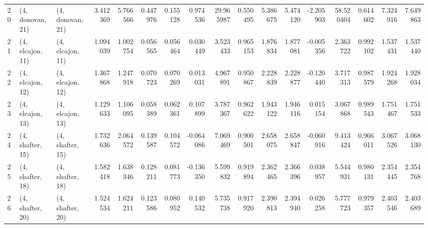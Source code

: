 \begin{tabular}{lllrrrrrrrrrrrrrr}
20 &  (4, donovan, 21) &  (4, donovan, 21) &  3.412369 &  5.766566 &   0.447976 &  0.155128 &  0.974536 &  29.965987 &  0.550495 &   5.386675 &  5.474120 & -2.205903 &  58.520404 &  0.614602 &  7.324916 &  7.649863 \\
21 &  (4, elcajon, 11) &  (4, elcajon, 11) &  1.094039 &  1.002754 &   0.056565 &  0.056464 &  0.030449 &   3.523433 &  0.965153 &   1.876834 &  1.877081 & -0.005356 &   2.363722 &  0.992102 &  1.537431 &  1.537440 \\
22 &  (4, elcajon, 12) &  (4, elcajon, 12) &  1.367868 &  1.247918 &   0.070723 &  0.070269 &  0.013031 &   4.967891 &  0.950867 &   2.228839 &  2.228877 & -0.120440 &   3.717313 &  0.987579 &  1.924268 &  1.928034 \\
23 &  (4, elcajon, 13) &  (4, elcajon, 13) &  1.129633 &  1.106095 &   0.058389 &  0.062361 &  0.107899 &   3.787367 &  0.962622 &   1.943122 &  1.946116 &  0.015154 &   3.067868 &  0.989543 &  1.751467 &  1.751533 \\
24 &  (4, shafter, 15) &  (4, shafter, 15) &  1.732636 &  2.064572 &   0.139587 &  0.104572 & -0.064086 &   7.069469 &  0.900501 &   2.658075 &  2.658847 & -0.060916 &   9.413424 &  0.966011 &  3.067526 &  3.068130 \\
25 &  (4, shafter, 18) &  (4, shafter, 18) &  1.582418 &  1.638346 &   0.128211 &  0.081773 & -0.136350 &   5.599832 &  0.919894 &   2.362465 &  2.366396 &  0.038957 &   5.544931 &  0.980131 &  2.354445 &  2.354768 \\
26 &  (4, shafter, 20) &  (4, shafter, 20) &  1.524534 &  1.624211 &   0.123586 &  0.080952 &  0.140532 &   5.735738 &  0.917920 &   2.390813 &  2.394940 &  0.026258 &   5.777723 &  0.979357 &  2.403546 &  2.403689 \\
\bottomrule
\end{tabular}
